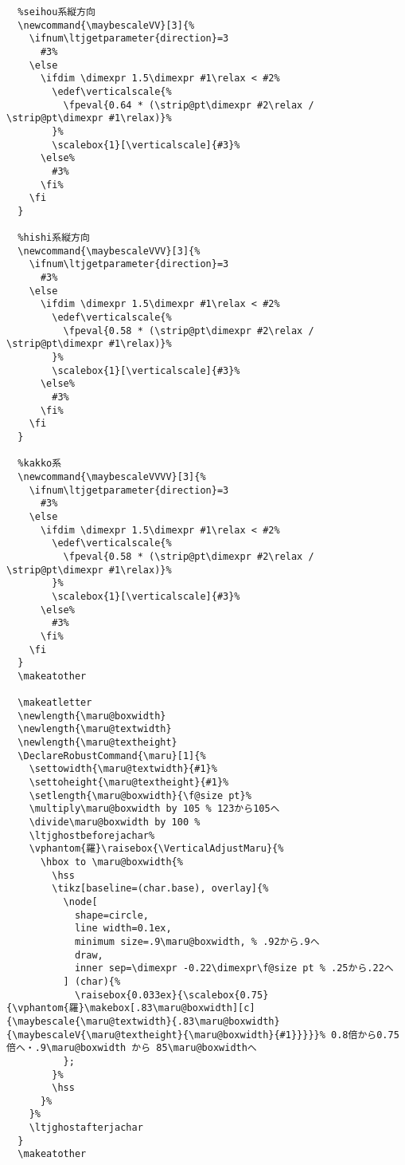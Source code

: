 \documentclass[luatex,fontsize=10pt,paper=b5,twoside]{jlreq}%
\begin{document}
\begin{lstlisting}
  %seihou系縦方向
  \newcommand{\maybescaleVV}[3]{%
    \ifnum\ltjgetparameter{direction}=3
      #3%
    \else
      \ifdim \dimexpr 1.5\dimexpr #1\relax < #2%
        \edef\verticalscale{%
          \fpeval{0.64 * (\strip@pt\dimexpr #2\relax / \strip@pt\dimexpr #1\relax)}%
        }%
        \scalebox{1}[\verticalscale]{#3}%
      \else%
        #3%
      \fi%
    \fi
  }

  %hishi系縦方向
  \newcommand{\maybescaleVVV}[3]{%
    \ifnum\ltjgetparameter{direction}=3
      #3%
    \else
      \ifdim \dimexpr 1.5\dimexpr #1\relax < #2%
        \edef\verticalscale{%
          \fpeval{0.58 * (\strip@pt\dimexpr #2\relax / \strip@pt\dimexpr #1\relax)}%
        }%
        \scalebox{1}[\verticalscale]{#3}%
      \else%
        #3%
      \fi%
    \fi
  }

  %kakko系
  \newcommand{\maybescaleVVVV}[3]{%
    \ifnum\ltjgetparameter{direction}=3
      #3%
    \else
      \ifdim \dimexpr 1.5\dimexpr #1\relax < #2%
        \edef\verticalscale{%
          \fpeval{0.58 * (\strip@pt\dimexpr #2\relax / \strip@pt\dimexpr #1\relax)}%
        }%
        \scalebox{1}[\verticalscale]{#3}%
      \else%
        #3%
      \fi%
    \fi
  }
  \makeatother

  \makeatletter
  \newlength{\maru@boxwidth}
  \newlength{\maru@textwidth}
  \newlength{\maru@textheight}
  \DeclareRobustCommand{\maru}[1]{%
    \settowidth{\maru@textwidth}{#1}%
    \settoheight{\maru@textheight}{#1}%
    \setlength{\maru@boxwidth}{\f@size pt}%
    \multiply\maru@boxwidth by 105 % 123から105へ
    \divide\maru@boxwidth by 100 %
    \ltjghostbeforejachar%
    \vphantom{羅}\raisebox{\VerticalAdjustMaru}{%
      \hbox to \maru@boxwidth{%
        \hss
        \tikz[baseline=(char.base), overlay]{%
          \node[
            shape=circle,
            line width=0.1ex,  
            minimum size=.9\maru@boxwidth, % .92から.9へ
            draw,
            inner sep=\dimexpr -0.22\dimexpr\f@size pt % .25から.22へ   
          ] (char){%
            \raisebox{0.033ex}{\scalebox{0.75}{\vphantom{羅}\makebox[.83\maru@boxwidth][c]{\maybescale{\maru@textwidth}{.83\maru@boxwidth}{\maybescaleV{\maru@textheight}{\maru@boxwidth}{#1}}}}}% 0.8倍から0.75倍へ・.9\maru@boxwidth から 85\maru@boxwidthへ
          };
        }%
        \hss
      }%
    }%
    \ltjghostafterjachar
  }
  \makeatother


\end{lstlisting}
\end{document}
